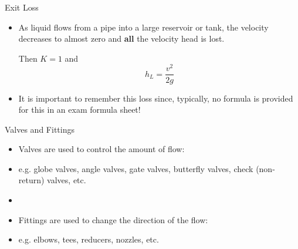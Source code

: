 \documentclass[9pt,xcolor={svgnames, x11names},professionalfonts, mathserif]{beamer}
\begin{document}

\begin{frame}{Exit Loss}

 \begin{itemize}

  \item As liquid flows from a pipe into a large reservoir or tank, the velocity decreases to almost zero and {\bfseries all} the velocity head is lost. \parm

        Then $K=1$ and
        \[ h_L = \frac{v^2}{2g} \]
        \parm
  \item  It is important to remember this loss since, typically, no formula is provided for this in an exam
        formula sheet!

 \end{itemize}
\end{frame}



\begin{frame}{Valves and Fittings}

 \begin{itemize}

  \item Valves are used to control the amount of flow:
  \item [] e.g. globe valves, angle valves, gate valves, butterfly valves, check (non-return) valves, etc.
  \item []
  \item Fittings are used to change the direction of the flow:
  \item [] e.g. elbows, tees, reducers, nozzles, etc.

 \end{itemize}
\end{frame}
\end{document}
